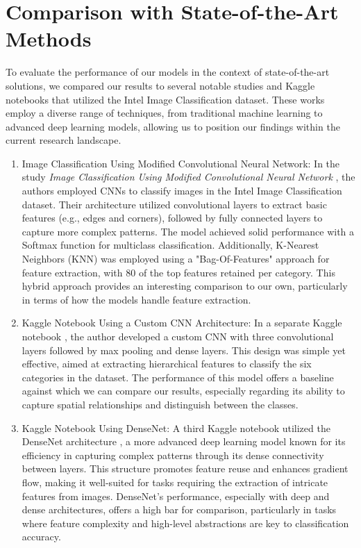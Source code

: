 \section{Comparison with State-of-the-Art Methods}

To evaluate the performance of our models in the context of state-of-the-art solutions, we compared our results to several notable studies and Kaggle notebooks that utilized the Intel Image Classification dataset. These works employ a diverse range of techniques, from traditional machine learning to advanced deep learning models, allowing us to position our findings within the current research landscape.

\begin{enumerate}
    \item Image Classification Using Modified Convolutional Neural Network: 
In the study \textit{Image Classification Using Modified Convolutional Neural Network} \cite{khan2024image}, the authors employed CNNs to classify images in the Intel Image Classification dataset. Their architecture utilized convolutional layers to extract basic features (e.g., edges and corners), followed by fully connected layers to capture more complex patterns. The model achieved solid performance with a Softmax function for multiclass classification. Additionally, K-Nearest Neighbors (KNN) was employed using a "Bag-Of-Features" approach for feature extraction, with 80 of the top features retained per category. This hybrid approach provides an interesting comparison to our own, particularly in terms of how the models handle feature extraction.
 
    
    \item Kaggle Notebook Using a Custom CNN Architecture: 
In a separate Kaggle notebook \cite{kaggle2024intel}, the author developed a custom CNN with three convolutional layers followed by max pooling and dense layers. This design was simple yet effective, aimed at extracting hierarchical features to classify the six categories in the dataset. The performance of this model offers a baseline against which we can compare our results, especially regarding its ability to capture spatial relationships and distinguish between the classes.


    \item Kaggle Notebook Using DenseNet:
A third Kaggle notebook utilized the DenseNet architecture \cite{kaggle2023densenet}, a more advanced deep learning model known for its efficiency in capturing complex patterns through its dense connectivity between layers. This structure promotes feature reuse and enhances gradient flow, making it well-suited for tasks requiring the extraction of intricate features from images. DenseNet's performance, especially with deep and dense architectures, offers a high bar for comparison, particularly in tasks where feature complexity and high-level abstractions are key to classification accuracy.
\end{enumerate}

